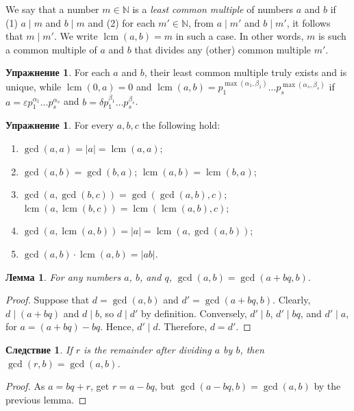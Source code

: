 \documentclass[12pt,notitlepage]{article}
\theoremstyle{plain}
\newtheorem{lemma}[thm]{Лемма}
\newtheorem{corr}[thm]{Следствие}
\theoremstyle{definition}
\newtheorem{exc}[thm]{Упражнение}
\theoremstyle{plain}
\newcommand{\N}{\mathbb{N}}
\newcommand{\eps}{\varepsilon}
\newcommand{\1}{\mathbf{1}}
\newcommand{\0}{\mathbf{0}}
\newcommand{\dvd}{\mathop{\mid}}
\DeclareMathOperator{\lcm}{lcm}
\newcommand{\mcomm}[1]{}
\begin{document}
We say that a number $m \in \N$ is a \emph{least common multiple} of numbers $a$ and $b$ if (1) $a \dvd m$ and $b \dvd m$ and (2) for each $m' \in \N$, from $a \dvd m'$ and $b \dvd m'$, it follows that $m \dvd m'$. We write $\lcm (a, b) = m$ in such a case. In other words, $m$ is such a common multiple of $a$ and $b$ that divides any (other) common multiple $m'$.
\begin{exc}
	For each $a$ and $b$, their least common multiple truly exists and is unique, while $\lcm(0, a) = 0$ and $\lcm(a, b) = p^{\max(\alpha_1, \beta_1)}_1\ldots p^{\max(\alpha_s, \beta_s)}_s$ if $a = \eps p^{\alpha_1}_1\ldots p^{\alpha_s}_s$ and $b = \delta p^{\beta_1}_1\ldots p^{\beta_s}_s$.
\end{exc}
\mcomm{There is a clear similarity between $\gcd$ and minimum (respectively, $\lcm$ and maximum)---since both are infima for suitable posets (we will elaborate on the idea later). The Instructor might want to highlight this fact.}
\begin{exc} For every $a, b, c$ the following hold:
	\begin{enumerate}
		\item $\gcd(a, a) = |a| = \lcm(a, a)$;
		\item $\gcd(a, b) = \gcd(b,a)$; $\lcm(a, b) = \lcm(b,a)$;
		\item $\gcd(a, \gcd(b, c)) = \gcd(\gcd(a, b), c)$; $\lcm(a, \lcm(b, c)) = \lcm(\lcm(a, b), c)$;
		\item $\gcd(a, \lcm(a, b)) = |a| = \lcm(a, \gcd(a, b))$;
		\item $\gcd(a,b)\cdot \lcm(a, b) = |ab|$.
	\end{enumerate}
\end{exc}

\begin{lemma}
	For any numbers $a$, $b$, and $q$, $\gcd(a, b) = \gcd(a + bq, b)$.
\end{lemma}
\begin{proof}
	Suppose that $d = \gcd(a,b)$ and $d' = \gcd(a + bq, b)$. Clearly, $d \dvd (a + bq)$ and $d \dvd b$, so $d \dvd d'$ by definition. Conversely, $d' \dvd b$, $d' \dvd bq$, and $d' \dvd a$, for $a = (a + bq) - bq$. Hence, $d' \dvd d$. Therefore, $d = d'$.
\end{proof}

\begin{corr}\label{L5:c_gcd_rem}
	If $r$ is the remainder after dividing $a$ by $b$, then $\gcd(r, b) = \gcd(a, b)$.
\end{corr}
\begin{proof}
	As $a = bq + r$, get $r = a - bq$, but $\gcd(a - bq, b) = \gcd(a, b)$ by the previous lemma.
\end{proof}
\end{document}
